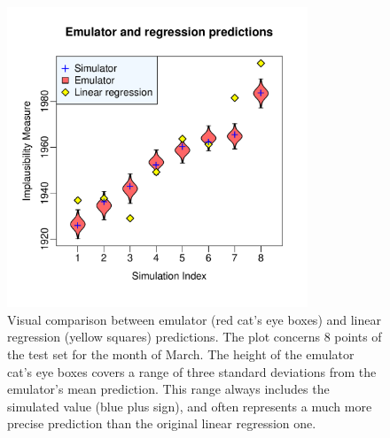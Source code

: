 \documentclass[a4paper, 12pt]{article}
\begin{document}
\begin{figure}
\centering
 \includegraphics[width=0.8\textwidth]{Validation_Plots/Comparison_LR/LR_Mar_82-89}
 \caption{Visual comparison between emulator (red cat's eye boxes) and linear regression (yellow squares) predictions. The plot concerns 8 points of the test set for the month of March. The height of the emulator cat's eye boxes covers a range of three standard deviations from the emulator's mean prediction. This range always includes the simulated value (blue plus sign), and often represents a much more precise prediction than the original linear regression one.}
 \label{Fig_Comparison_LR}
\end{figure}
\end{document}
